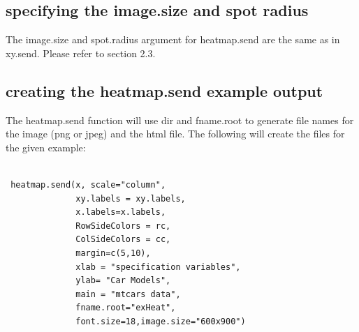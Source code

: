 \documentclass[]{article}
\begin{document}
\subsection{specifying the image.size and spot radius}

\indent The image.size and spot.radius argument for heatmap.send are the same as in xy.send. Please refer to section 2.3.

\subsection{creating the heatmap.send example output}

\indent The heatmap.send function will use dir and fname.root to generate file names for the image (png or jpeg) and the html file. The following will create the files for the given example:




\begin{verbatim}

 heatmap.send(x, scale="column",
              xy.labels = xy.labels,
              x.labels=x.labels,
              RowSideColors = rc,
              ColSideColors = cc, 
              margin=c(5,10),
              xlab = "specification variables", 
              ylab= "Car Models",
              main = "mtcars data",
              fname.root="exHeat", 
              font.size=18,image.size="600x900")

\end{verbatim}
\end{document}
